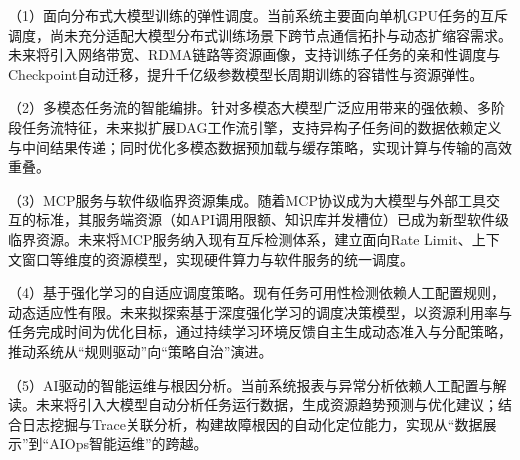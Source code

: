（1）面向分布式大模型训练的弹性调度。当前系统主要面向单机GPU任务的互斥调度，尚未充分适配大模型分布式训练场景下跨节点通信拓扑与动态扩缩容需求。未来将引入网络带宽、RDMA链路等资源画像，支持训练子任务的亲和性调度与Checkpoint自动迁移，提升千亿级参数模型长周期训练的容错性与资源弹性。

（2）多模态任务流的智能编排。针对多模态大模型广泛应用带来的强依赖、多阶段任务流特征，未来拟扩展DAG工作流引擎，支持异构子任务间的数据依赖定义与中间结果传递；同时优化多模态数据预加载与缓存策略，实现计算与传输的高效重叠。

（3）MCP服务与软件级临界资源集成。随着MCP协议成为大模型与外部工具交互的标准，其服务端资源（如API调用限额、知识库并发槽位）已成为新型软件级临界资源。未来将MCP服务纳入现有互斥检测体系，建立面向Rate Limit、上下文窗口等维度的资源模型，实现硬件算力与软件服务的统一调度。

（4）基于强化学习的自适应调度策略。现有任务可用性检测依赖人工配置规则，动态适应性有限。未来拟探索基于深度强化学习的调度决策模型，以资源利用率与任务完成时间为优化目标，通过持续学习环境反馈自主生成动态准入与分配策略，推动系统从“规则驱动”向“策略自治”演进。

（5）AI驱动的智能运维与根因分析。当前系统报表与异常分析依赖人工配置与解读。未来将引入大模型自动分析任务运行数据，生成资源趋势预测与优化建议；结合日志挖掘与Trace关联分析，构建故障根因的自动化定位能力，实现从“数据展示”到“AIOps智能运维”的跨越。

\makeatletter
\@openrightfalse
\makeatother